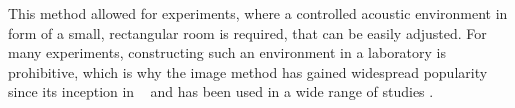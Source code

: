 This method allowed for experiments, where a controlled acoustic environment in form of a small, rectangular room is required, that can be easily adjusted. For many experiments, constructing such an environment in a laboratory is prohibitive, which is why the image method has gained widespread popularity since its inception in \citeyear{Allen1979}~\cite{Allen1979} and has been used in a wide range of studies \cite{Champagne1996}.
